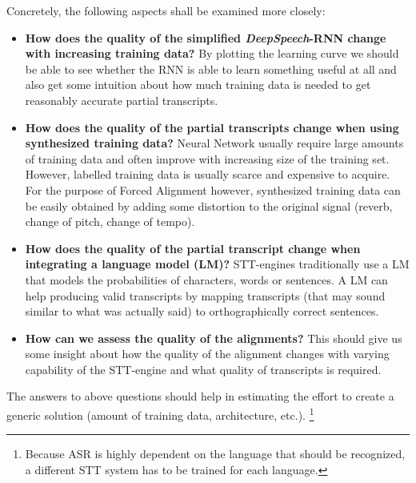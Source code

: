 Concretely, the following aspects shall be examined more closely:

\begin{itemize}
	\item \textbf{How does the quality of the simplified \textit{DeepSpeech}-RNN change with increasing training data?} By plotting the learning curve we should be able to see whether the RNN is able to learn something useful at all and also get some intuition about how much training data is needed to get reasonably accurate partial transcripts.
	\item \textbf{How does the quality of the partial transcripts change when using synthesized training data?} Neural Network usually require large amounts of training data and often improve with increasing size of the training set. However, labelled training data is usually scarce and expensive to acquire. For the purpose of Forced Alignment however, synthesized training data can be easily obtained by adding some distortion to the original signal (reverb, change of pitch, change of tempo).
	\item \textbf{How does the quality of the partial transcript change when integrating a language model (LM)?} STT-engines traditionally use a LM that models the probabilities of characters, words or sentences. A LM can help producing valid transcripts by mapping transcripts (that may sound similar to what was actually said) to orthographically correct sentences.
	\item \textbf{How can we assess the quality of the alignments?} This should give us some insight about how the quality of the alignment changes with varying capability of the STT-engine and what quality of transcripts is required.
\end{itemize}

The answers to above questions should help in estimating the effort to create a generic solution (amount of training data, architecture, etc.). \footnote{Because ASR is highly dependent on the language that should be recognized, a different STT system has to be trained for each language.}